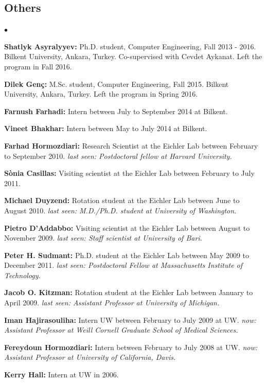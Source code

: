 \documentclass[margin,line]{res}
\newenvironment{list2}{
  \begin{list}{$\bullet$}{%
      \setlength{\itemsep}{0in}
      \setlength{\parsep}{0in} \setlength{\parskip}{0in}
      \setlength{\topsep}{0in} \setlength{\partopsep}{0in} 
      \setlength{\leftmargin}{0.2in}}}{\end{list}}
\begin{document}
\begin{resume}
\subsection{\small \sc Others}
\begin{list2}
\item
  {\bf Shatlyk Asyralyyev:} Ph.D. student, Computer Engineering, Fall 2013 - 2016.
  Bilkent University, Ankara, Turkey. Co-supervised with Cevdet Aykanat. Left the program in Fall 2016.
\item
{\bf Dilek Genç:} M.Sc. student, Computer Engineering, Fall 2015.
  Bilkent University, Ankara, Turkey. Left the program in Spring 2016. 
\item
  {\bf Farnush Farhadi:} Intern between July to September 2014 at Bilkent.
\item
  {\bf Vineet Bhakhar:} Intern between May to July 2014 at Bilkent. 
\item
  {\bf Farhad Hormozdiari:} Research Scientist at the Eichler Lab between February to September 2010.
  {\it last seen: Postdoctoral fellow  at Harvard University.}
\item
  {\bf S\`{o}nia Casillas:} Visiting scientist at the Eichler Lab between February to July 2011.
\item
  {\bf Michael Duyzend:} Rotation student at the Eichler Lab between June to August 2010.
  {\it last seen: M.D./Ph.D. student at University of Washington.}
\item
  {\bf Pietro D'Addabbo:} Visiting scientist at the Eichler Lab between August to November 2009.
  {\it last seen: Staff scientist at University of Bari.}
\item
  {\bf Peter H. Sudmant:} Ph.D. student at the Eichler Lab between May 2009 to December 2011.
  {\it last seen: Postdoctoral Fellow at Massachusetts Institute of Technology.}
\item
  {\bf Jacob O. Kitzman:} Rotation student at the Eichler Lab between January to April 2009.
  {\it last seen: Assistant Professor at University of Michigan.}
\item
  {\bf Iman Hajirasouliha:}  Intern UW between February to July 2009 at UW.
  {\it now: Assistant Professor at Weill Cornell Graduate School of Medical Sciences.}
\item
  {\bf Fereydoun Hormozdiari:} Intern between February to July 2008 at UW. 
  {\it now: Assistant Professor at University of California, Davis.}
\item
  {\bf Kerry Hall:} Intern at UW in 2006. 


\end{list2}
\end{resume}
\end{document}
